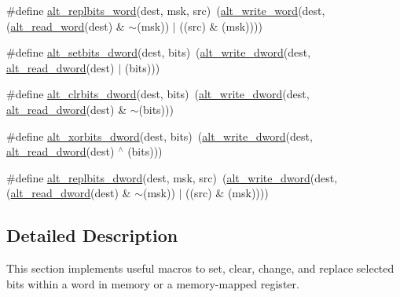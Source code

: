 \begin{DoxyCompactItemize}
\item 
\#define \mbox{\hyperlink{group__ALT__SOCAL__UTIL__SC__FUNC_ga49f71d50753602650d88d17643165631}{alt\+\_\+replbits\+\_\+word}}(dest,  msk,  src)~(\mbox{\hyperlink{group__ALT__SOCAL__UTIL__RW__FUNC_gac135ea12921af3aeb033c92ddb82c66c}{alt\+\_\+write\+\_\+word}}(dest,(\mbox{\hyperlink{group__ALT__SOCAL__UTIL__RW__FUNC_ga77db76edef8b90adb75eb837325b5d11}{alt\+\_\+read\+\_\+word}}(dest) \& $\sim$(msk)) $\vert$ ((src) \& (msk))))
\item 
\#define \mbox{\hyperlink{group__ALT__SOCAL__UTIL__SC__FUNC_gaffad3d0d27109b17cf4e0d38891d7f04}{alt\+\_\+setbits\+\_\+dword}}(dest,  bits)~(\mbox{\hyperlink{group__ALT__SOCAL__UTIL__RW__FUNC_ga0fe80f8e5b6f3f09976dd35df49285e7}{alt\+\_\+write\+\_\+dword}}(dest, \mbox{\hyperlink{group__ALT__SOCAL__UTIL__RW__FUNC_gad66f5bf6cf73c5ba348a7ab118bcd2a0}{alt\+\_\+read\+\_\+dword}}(dest) $\vert$ (bits)))
\item 
\#define \mbox{\hyperlink{group__ALT__SOCAL__UTIL__SC__FUNC_ga77f1adf2ec7cf806a77a76dcaf35d7de}{alt\+\_\+clrbits\+\_\+dword}}(dest,  bits)~(\mbox{\hyperlink{group__ALT__SOCAL__UTIL__RW__FUNC_ga0fe80f8e5b6f3f09976dd35df49285e7}{alt\+\_\+write\+\_\+dword}}(dest, \mbox{\hyperlink{group__ALT__SOCAL__UTIL__RW__FUNC_gad66f5bf6cf73c5ba348a7ab118bcd2a0}{alt\+\_\+read\+\_\+dword}}(dest) \& $\sim$(bits)))
\item 
\#define \mbox{\hyperlink{group__ALT__SOCAL__UTIL__SC__FUNC_gaca89190166ce3b0277d53c55eaa1769b}{alt\+\_\+xorbits\+\_\+dword}}(dest,  bits)~(\mbox{\hyperlink{group__ALT__SOCAL__UTIL__RW__FUNC_ga0fe80f8e5b6f3f09976dd35df49285e7}{alt\+\_\+write\+\_\+dword}}(dest, \mbox{\hyperlink{group__ALT__SOCAL__UTIL__RW__FUNC_gad66f5bf6cf73c5ba348a7ab118bcd2a0}{alt\+\_\+read\+\_\+dword}}(dest) $^\wedge$ (bits)))
\item 
\#define \mbox{\hyperlink{group__ALT__SOCAL__UTIL__SC__FUNC_ga93206252fb66efc3dc77b62b1ea4bd0d}{alt\+\_\+replbits\+\_\+dword}}(dest,  msk,  src)~(\mbox{\hyperlink{group__ALT__SOCAL__UTIL__RW__FUNC_ga0fe80f8e5b6f3f09976dd35df49285e7}{alt\+\_\+write\+\_\+dword}}(dest,(\mbox{\hyperlink{group__ALT__SOCAL__UTIL__RW__FUNC_gad66f5bf6cf73c5ba348a7ab118bcd2a0}{alt\+\_\+read\+\_\+dword}}(dest) \& $\sim$(msk)) $\vert$ ((src) \& (msk))))
\end{DoxyCompactItemize}


\subsection{Detailed Description}
This section implements useful macros to set, clear, change, and replace selected bits within a word in memory or a memory-\/mapped register. 

